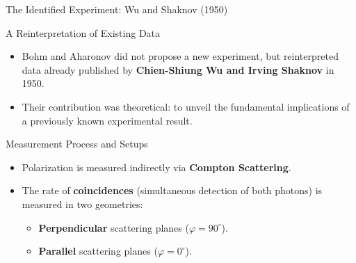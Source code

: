 \begin{frame}{The Identified Experiment: Wu and Shaknov (1950)}

  \begin{block}{A Reinterpretation of Existing Data}
    \begin{itemize}[<+->]
      \item Bohm and Aharonov did not propose a new experiment, but reinterpreted data already published by \textbf{Chien-Shiung Wu and Irving Shaknov} in 1950.
      \item Their contribution was theoretical: to unveil the fundamental implications of a previously known experimental result.
    \end{itemize}
  \end{block}

  \begin{alertblock}{Measurement Process and Setups}
    \begin{itemize}[<+->]
      \item Polarization is measured indirectly via \textbf{Compton Scattering}.
      \item The rate of \textbf{coincidences} (simultaneous detection of both photons) is measured in two geometries:
        \begin{itemize}
          \item \textbf{Perpendicular} scattering planes ($\varphi = 90^\circ$).
          \item \textbf{Parallel} scattering planes ($\varphi = 0^\circ$).
        \end{itemize}
    \end{itemize}
  \end{alertblock}

\end{frame}


